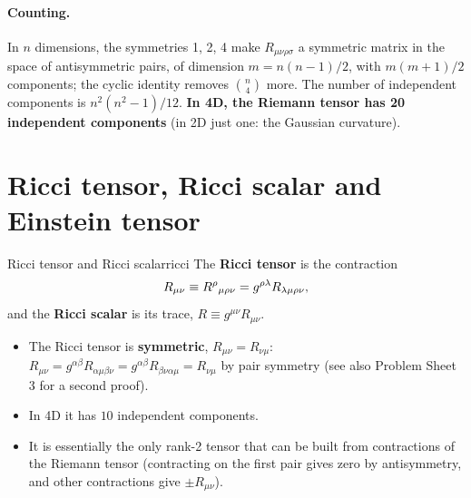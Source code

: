 \paragraph{Counting.} In $n$ dimensions, the symmetries 1, 2, 4 make $R_{\mu\nu\rho\sigma}$ a symmetric matrix in the space of antisymmetric pairs, of dimension $m=n(n-1)/2$, with $m(m+1)/2$ components; the cyclic identity removes $\binom n4$ more. The number of independent components is $n^2(n^2-1)/12$. \textbf{In 4D, the Riemann tensor has 20 independent components} (in 2D just one: the Gaussian curvature).

\section{Ricci tensor, Ricci scalar and Einstein tensor}

\begin{definition}{Ricci tensor and Ricci scalar}{ricci}
The \textbf{Ricci tensor} is the contraction
\begin{equation}
  R_{\mu\nu}\equiv R^{\rho}{}_{\mu\rho\nu}=g^{\rho\lambda}R_{\lambda\mu\rho\nu},
\end{equation}
and the \textbf{Ricci scalar} is its trace, $R\equiv g^{\mu\nu}R_{\mu\nu}$.
\end{definition}
\begin{itemize}[nosep]
  \item The Ricci tensor is \textbf{symmetric}, $R_{\mu\nu}=R_{\nu\mu}$: $R_{\mu\nu}=g^{\alpha\beta}R_{\alpha\mu\beta\nu}=g^{\alpha\beta}R_{\beta\nu\alpha\mu}=R_{\nu\mu}$ by pair symmetry (see also Problem Sheet 3 for a second proof).
  \item In 4D it has $10$ independent components.
  \item It is essentially the only rank-2 tensor that can be built from contractions of the Riemann tensor (contracting on the first pair gives zero by antisymmetry, and other contractions give $\pm R_{\mu\nu}$).
\end{itemize}

